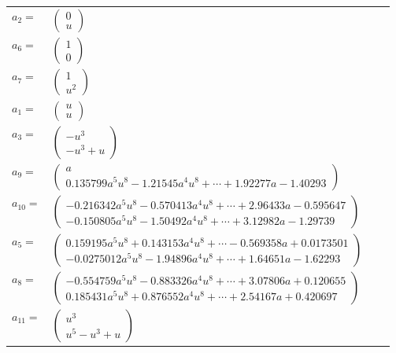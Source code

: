 \documentclass[1p]{elsarticle_modified}
\theoremstyle{definition}
\begin{document}
\begin{tabular}{m{7pt} m{180pt} m{7pt} m{180pt} }
\flushright $a_{2}=$&$\begin{pmatrix}0\\u\end{pmatrix}$ \\
\flushright $a_{6}=$&$\begin{pmatrix}1\\0\end{pmatrix}$ \\
\flushright $a_{7}=$&$\begin{pmatrix}1\\u^2\end{pmatrix}$ \\
\flushright $a_{1}=$&$\begin{pmatrix}u\\u\end{pmatrix}$ \\
\flushright $a_{3}=$&$\begin{pmatrix}- u^3\\- u^3+u\end{pmatrix}$ \\
\flushright $a_{9}=$&$\begin{pmatrix}a\\0.135799 a^{5} u^{8}-1.21545 a^{4} u^{8}+\cdots+1.92277 a-1.40293\end{pmatrix}$ \\
\flushright $a_{10}=$&$\begin{pmatrix}-0.216342 a^{5} u^{8}-0.570413 a^{4} u^{8}+\cdots+2.96433 a-0.595647\\-0.150805 a^{5} u^{8}-1.50492 a^{4} u^{8}+\cdots+3.12982 a-1.29739\end{pmatrix}$ \\
\flushright $a_{5}=$&$\begin{pmatrix}0.159195 a^{5} u^{8}+0.143153 a^{4} u^{8}+\cdots-0.569358 a+0.0173501\\-0.0275012 a^{5} u^{8}-1.94896 a^{4} u^{8}+\cdots+1.64651 a-1.62293\end{pmatrix}$ \\
\flushright $a_{8}=$&$\begin{pmatrix}-0.554759 a^{5} u^{8}-0.883326 a^{4} u^{8}+\cdots+3.07806 a+0.120655\\0.185431 a^{5} u^{8}+0.876552 a^{4} u^{8}+\cdots+2.54167 a+0.420697\end{pmatrix}$ \\
\flushright $a_{11}=$&$\begin{pmatrix}u^3\\u^5- u^3+u\end{pmatrix}$ \\

\end{tabular}
\end{document}
